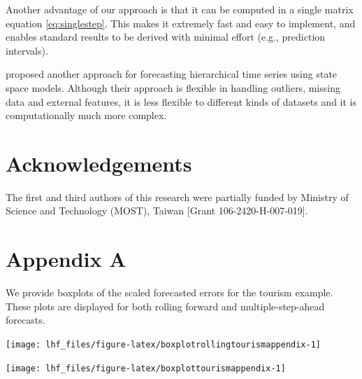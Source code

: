 \documentclass[11pt,a4paper,]{article}
\let\origfigure\figure
\let\endorigfigure\endfigure
\renewenvironment{figure}[1][2] {
    \expandafter\origfigure\expandafter[!htbp]
} {
    \endorigfigure
}
\begin{document}
Another advantage of our approach is that it can be computed in a single matrix equation \eqref{eq:singlestep}. This makes it extremely fast and easy to implement, and enables standard results to be derived with minimal effort (e.g., prediction intervals).

\textcite{pennings2017} proposed another approach for forecasting hierarchical time series using state space models. Although their approach is flexible in handling outliers, missing data and external features, it is less flexible to different kinds of datasets and it is computationally much more complex.

\hypertarget{acknowledgements}{%
\section*{Acknowledgements}\label{acknowledgements}}

The first and third authors of this research were partially funded by Ministry of Science and Technology (MOST), Taiwan {[}Grant 106-2420-H-007-019{]}.

\clearpage

\hypertarget{appendixA}{%
\section*{Appendix A}\label{appendixA}}

We provide boxplots of the scaled forecasted errors for the tourism example. These plots are displayed for both rolling forward and multiple-step-ahead forecasts.

\begin{figure}

{\centering \texttt{[image: lhf\_files/figure-latex/boxplotrollingtourismappendix-1]} 

}

\caption{Box plots of scaled forecast errors from reconciled and unreconciled ETS, ARIMA and OLS methods at each hierarchical level for rolling origin 1-step-ahead tourism demand.}\label{fig:boxplotrollingtourismappendix}
\end{figure}

\begin{figure}

{\centering \texttt{[image: lhf\_files/figure-latex/boxplottourismappendix-1]} 

}

\caption{Box plots of scaled forecast errors from reconciled and unreconciled ETS, ARIMA and OLS methods at each hierarchical level for fixed origin multi-step-ahead tourism demand.}\label{fig:boxplottourismappendix}
\end{figure}
\end{document}
